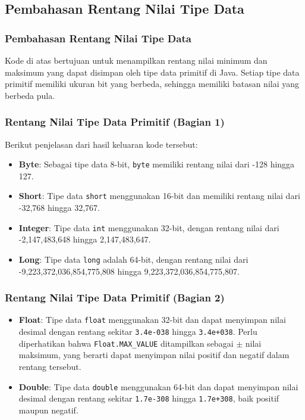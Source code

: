 \documentclass[aspectratio=169, table]{beamer}
\begin{document}
\subsection{Pembahasan Rentang Nilai Tipe Data}
\begin{frame}[fragile]
	\frametitle{Pembahasan Rentang Nilai Tipe Data}
	Kode di atas bertujuan untuk menampilkan rentang nilai minimum dan maksimum yang dapat disimpan oleh tipe data primitif di Java. Setiap tipe data primitif memiliki ukuran bit yang berbeda, sehingga memiliki batasan nilai yang berbeda pula.
\end{frame}

\begin{frame}
	\frametitle{Rentang Nilai Tipe Data Primitif (Bagian 1)}
	Berikut penjelasan dari hasil keluaran kode tersebut:
	\begin{itemize}
		\item \textbf{Byte}: Sebagai tipe data 8-bit, \texttt{byte} memiliki rentang nilai dari -128 hingga 127.
		\item \textbf{Short}: Tipe data \texttt{short} menggunakan 16-bit dan memiliki rentang nilai dari -32,768 hingga 32,767.
		\item \textbf{Integer}: Tipe data \texttt{int} menggunakan 32-bit, dengan rentang nilai dari -2,147,483,648 hingga 2,147,483,647.
		\item \textbf{Long}: Tipe data \texttt{long} adalah 64-bit, dengan rentang nilai dari -9,223,372,036,854,775,808 hingga 9,223,372,036,854,775,807.
	\end{itemize}
\end{frame}

\begin{frame}
	\frametitle{Rentang Nilai Tipe Data Primitif (Bagian 2)}
	\begin{itemize}
		\item \textbf{Float}: Tipe data \texttt{float} menggunakan 32-bit dan dapat menyimpan nilai desimal dengan rentang sekitar \texttt{3.4e-038} hingga \texttt{3.4e+038}. Perlu diperhatikan bahwa \texttt{Float.MAX\_VALUE} ditampilkan sebagai $\pm$ nilai maksimum, yang berarti dapat menyimpan nilai positif dan negatif dalam rentang tersebut.
		\item \textbf{Double}: Tipe data \texttt{double} menggunakan 64-bit dan dapat menyimpan nilai desimal dengan rentang sekitar \texttt{1.7e-308} hingga \texttt{1.7e+308}, baik positif maupun negatif.
	\end{itemize}
\end{frame}
\end{document}
